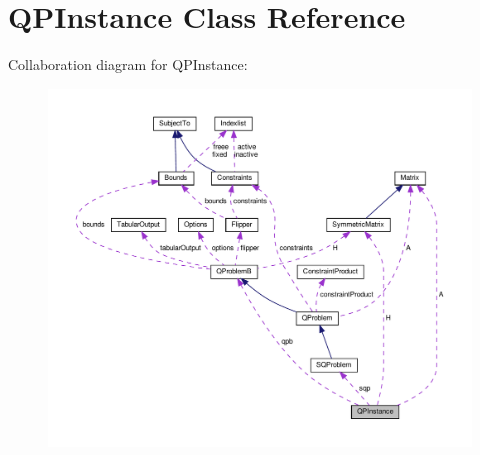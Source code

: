\hypertarget{class_q_p_instance}{}\section{Q\+P\+Instance Class Reference}
\label{class_q_p_instance}


Collaboration diagram for Q\+P\+Instance\+:
\nopagebreak
\begin{figure}[H]
\begin{center}
\leavevmode
\includegraphics[width=350pt]{class_q_p_instance__coll__graph}
\end{center}
\end{figure}
